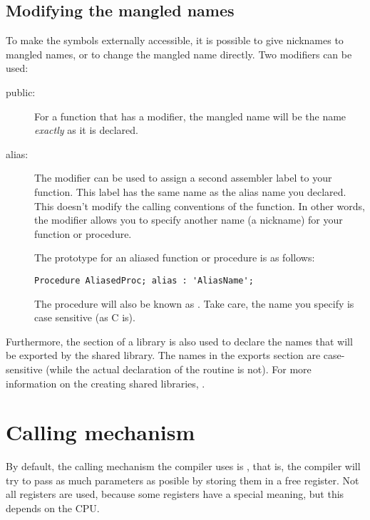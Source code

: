 \subsection{Modifying the mangled names}

To make the symbols externally accessible, it is possible to
give nicknames to mangled names, or to change the mangled
name directly. Two modifiers can be used:

\begin{description}
\item [public: ] For a function that has a  modifier, 
the mangled name will be the name {\em exactly} as it is declared.

\item [alias: ] The  modifier can be used to assign a second
assembler label to your function. This label has the same name as the
alias name you declared. This doesn't modify the calling conventions
of the function. In other words, the  modifier allows you to specify
another name (a nickname) for your function or procedure.

The prototype for an aliased function or procedure is as follows:
\begin{verbatim}
Procedure AliasedProc; alias : 'AliasName';
\end{verbatim}
The procedure  will also be known as . Take
care, the name you specify is case sensitive (as C is).

\end{description}

Furthermore, the  section of a library is also used to
declare the names that will be exported by the shared library. The
names in the exports section are case-sensitive (while the actual
declaration of the routine is not). For more information on the
creating shared libraries, .

\section{Calling mechanism}
\label{se:CallingConventions}

By default, the calling mechanism the compiler uses is , 
that is, the compiler will try to pass as much parameters as posible by 
storing them in a free register. Not all registers are used, because
some registers have a special meaning, but this depends on the CPU.

